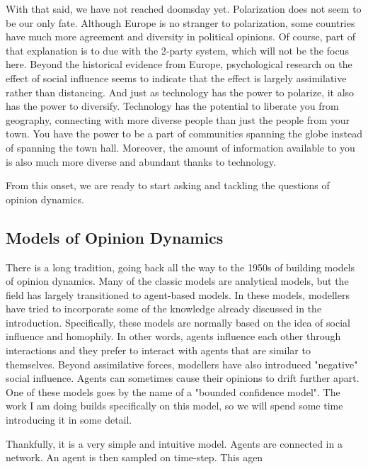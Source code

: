 \documentclass[9pt,twocolumn,twoside]{ilcss}
\begin{document}
With that said, we have not reached doomsday yet. Polarization does not seem to be our only fate.
Although Europe is no stranger to polarization, some countries have much more agreement and diversity in political opinions. 
Of course, part of that explanation is to due with the 2-party system, which will not be the focus here. 
Beyond the historical evidence from Europe, psychological research on the effect of social influence seems to indicate that the effect is largely assimilative rather than distancing.
And just as technology has the power to polarize, it also has the power to diversify. 
Technology has the potential to liberate you from geography, connecting with more diverse people than just the people from your town. 
You have the power to be a part of communities spanning the globe instead of spanning the town hall. 
Moreover, the amount of information available to you is also much more diverse and abundant thanks to technology. 

From this onset, we are ready to start asking and tackling the questions of opinion dynamics. 

\subsection{Models of Opinion Dynamics}
There is a long tradition, going back all the way to the 1950s of building models of opinion dynamics.
Many of the classic models are analytical models, but the field has largely transitioned to agent-based models.
In these models, modellers have tried to incorporate some of the knowledge already discussed in the introduction. 
Specifically, these models are normally based on the idea of social influence and homophily. 
In other words, agents influence each other through interactions and they prefer to interact with agents that are similar to themselves. 
Beyond assimilative forces, modellers have also introduced "negative" social influence. Agents can sometimes cause their opinions to drift further apart. 
One of these models goes by the name of a "bounded confidence model". The work I am doing builds specifically on this model, so we will spend some time introducing it in some detail.

Thankfully, it is a very simple and intuitive model. Agents are connected in a network. 
An agent is then sampled on time-step. This agen
\end{document}
